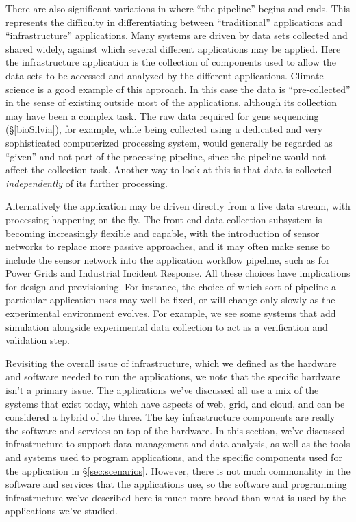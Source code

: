 \documentclass[times]{cpeauth}
\begin{document}
There are also significant variations in where ``the pipeline'' begins and
ends. This represents the difficulty in differentiating between ``traditional''
applications and ``infrastructure'' applications. Many systems are driven by
data sets collected and shared widely, against which several different
applications may be applied.  Here the infrastructure application is the
collection of components used to allow the data sets to be accessed and analyzed
by the different applications.  Climate science is a good example of this
approach. In this case the data is ``pre-collected'' in the sense of existing
outside most of the applications, although its collection may have been a
complex task. The raw data required for gene sequencing (\S\ref{bioSilvia}), for
example, while being collected using a dedicated and very sophisticated
computerized processing system, would generally be regarded as ``given'' and not
part of the processing pipeline, since the pipeline would not affect the
collection task. Another way to look at this is that data is collected
\emph{independently} of its further processing.

Alternatively the application may be driven directly from a live data stream,
with processing happening on the fly. The front-end data collection subsystem is
becoming increasingly flexible and capable, with the introduction of sensor
networks to replace more passive approaches, and it may often make sense to
include the sensor network into the application workflow pipeline, such as for
Power Grids and Industrial Incident Response. All these choices have
implications for design and provisioning. For instance, the choice of which sort
of pipeline a particular application uses may well be fixed, or will change only
slowly as the experimental environment evolves. For example, we see some systems
that add simulation alongside experimental data collection to act as a
verification and validation step.

Revisiting the overall issue of infrastructure, which we defined as the hardware
and software needed to run the applications, we note that the specific hardware
isn't a primary issue.  The applications we've discussed all use a mix of the
systems that exist today, which have aspects of web, grid, and cloud, and can be
considered a hybrid of the three.  The key infrastructure components are really
the software and services on top of the hardware.  In this section, we've
discussed infrastructure to support data management and data analysis, as well
as the tools and systems used to program applications, and the specific
components used for the application in \S\ref{sec:scenarios}.  However, there is
not much commonality in the software and services that the applications use, so
the software and programming infrastructure we've described here is much more
broad than what is used by the applications we've studied.
\end{document}
